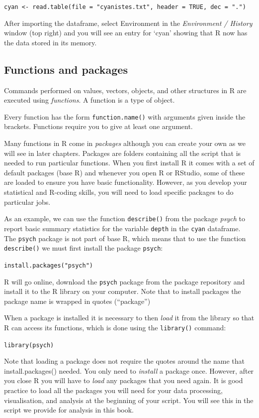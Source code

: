 \documentclass[
]{book}
\begin{document}
\texttt{cyan\ \textless{}-\ read.table(file\ =\ "cyanistes.txt",\ header\ =\ TRUE,\ dec\ =\ ".")}

After importing the dataframe, select Environment in the \emph{Environment / History} window (top right) and you will see an entry for `cyan' showing that R now has the data stored in its memory.

\hypertarget{functions}{%
\subsection{Functions and packages}\label{functions}}

Commands performed on values, vectors, objects, and other structures in R are executed using \emph{functions}. A function is a type of object.

Every function has the form \texttt{function.name()} with arguments given inside the brackets. Functions require you to give at least one argument.

Many functions in R come in \emph{packages} although you can create your own as we will see in later chapters. Packages are folders containing all the script that is needed to run particular functions. When you first install R it comes with a set of default packages (base R) and whenever you open R or RStudio, some of these are loaded to ensure you have basic functionality. However, as you develop your statistical and R-coding skills, you will need to load specific packages to do particular jobs.

As an example, we can use the function \texttt{describe()} from the package \emph{psych} to report basic summary statistics for the variable \texttt{depth} in the \texttt{cyan} dataframe. The \texttt{psych} package is not part of base R, which means that to use the function \texttt{describe()} we must first install the package \texttt{psych}:

\texttt{install.packages("psych")}

R will go online, download the \texttt{psych} package from the package repository and install it to the R library on your computer. Note that to install packages the package name is wrapped in quotes (``package'')

When a package is installed it is necessary to then \emph{load} it from the library so that R can access its functions, which is done using the \texttt{library()} command:

\texttt{library(psych)}

Note that loading a package does not require the quotes around the name that install.packages() needed. You only need to \emph{install} a package once. However, after you close R you will have to \emph{load} any packages that you need again. It is good practice to load all the packages you will need for your data processing, visualisation, and analysis at the beginning of your script. You will see this in the script we provide for analysis in this book.
\end{document}
